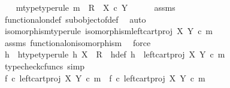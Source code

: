 \begin{isabellebody}
\isanewline
\ \ \isamarkupfalse%
\ m{\isacharunderscore}{\kern0pt}type{\isacharbrackleft}{\kern0pt}type{\isacharunderscore}{\kern0pt}rule{\isacharbrackright}{\kern0pt}{\isacharcolon}{\kern0pt}\ {\isachardoublequoteopen}m\ {\isacharcolon}{\kern0pt}\ R\ {\isasymrightarrow}\ X\ {\isasymtimes}\isactrlsub c\ Y{\isachardoublequoteclose}\isanewline
\ \ \ \ \isamarkupfalse%
\ assms\ \isamarkupfalse%
\ functional{\isacharunderscore}{\kern0pt}on{\isacharunderscore}{\kern0pt}def\ subobject{\isacharunderscore}{\kern0pt}of{\isacharunderscore}{\kern0pt}def{}\ \isamarkupfalse%
\ auto\isanewline
\ \ \isamarkupfalse%
\ isomorphism{\isacharbrackleft}{\kern0pt}type{\isacharunderscore}{\kern0pt}rule{\isacharbrackright}{\kern0pt}{\isacharcolon}{\kern0pt}\ {\isachardoublequoteopen}isomorphism{\isacharparenleft}{\kern0pt}left{\isacharunderscore}{\kern0pt}cart{\isacharunderscore}{\kern0pt}proj\ X\ Y\ {\isasymcirc}\isactrlsub c\ m{\isacharparenright}{\kern0pt}{\isachardoublequoteclose}\isanewline
\ \ \ \ \isamarkupfalse%
\ assms\ functional{\isacharunderscore}{\kern0pt}on{\isacharunderscore}{\kern0pt}isomorphism\ \isamarkupfalse%
\ force\ \ \isanewline
\ \ \isamarkupfalse%
\ h\ \ h{\isacharunderscore}{\kern0pt}type{\isacharbrackleft}{\kern0pt}type{\isacharunderscore}{\kern0pt}rule{\isacharbrackright}{\kern0pt}{\isacharcolon}{\kern0pt}\ {\isachardoublequoteopen}h{\isacharcolon}{\kern0pt}\ X\ {\isasymrightarrow}\ R{\isachardoublequoteclose}\ \ h{\isacharunderscore}{\kern0pt}def{\isacharcolon}{\kern0pt}\ {\isachardoublequoteopen}h\ {\isacharequal}{\kern0pt}\ {\isacharparenleft}{\kern0pt}left{\isacharunderscore}{\kern0pt}cart{\isacharunderscore}{\kern0pt}proj\ X\ Y\ {\isasymcirc}\isactrlsub c\ m{\isacharparenright}{\kern0pt}\isactrlbold {\isasyminverse}{\isachardoublequoteclose}\isanewline
\ \ \ \ \isamarkupfalse%
\ {\isacharparenleft}{\kern0pt}typecheck{\isacharunderscore}{\kern0pt}cfuncs{\isacharcomma}{\kern0pt}\ simp{\isacharparenright}{\kern0pt}\isanewline
\ \ \isamarkupfalse%
\ {\isachardoublequoteopen}f{}\ {\isasymcirc}\isactrlsub c\ left{\isacharunderscore}{\kern0pt}cart{\isacharunderscore}{\kern0pt}proj\ X\ Y\ {\isasymcirc}\isactrlsub c\ m\ {\isacharequal}{\kern0pt}\ f{}\ {\isasymcirc}\isactrlsub c\ left{\isacharunderscore}{\kern0pt}cart{\isacharunderscore}{\kern0pt}proj\ X\ Y\ {\isasymcirc}\isactrlsub c\ m{\isachardoublequoteclose}\isanewline

\end{isabellebody}
